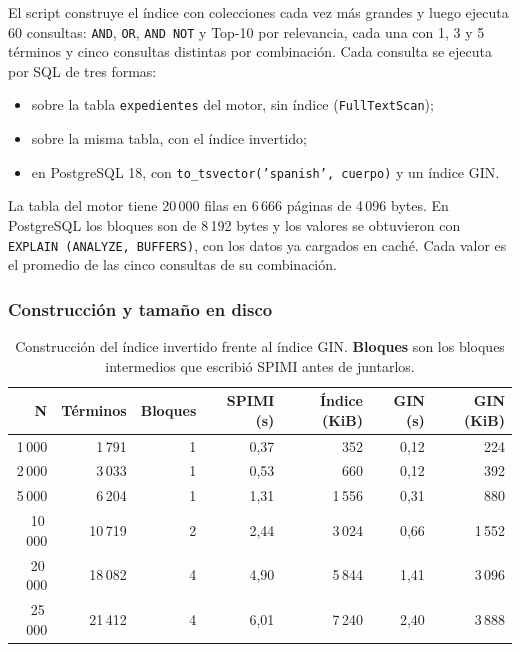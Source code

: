 \documentclass[a4paper,12pt]{article}
\begin{document}
El script construye el índice con colecciones cada vez más grandes y luego
ejecuta 60 consultas: \texttt{AND}, \texttt{OR}, \texttt{AND NOT} y Top-10 por
relevancia, cada una con 1, 3 y 5 términos y cinco consultas distintas por
combinación. Cada consulta se ejecuta por SQL de tres formas:

\begin{itemize}
    \item sobre la tabla \texttt{expedientes} del motor, sin índice
    (\texttt{FullTextScan});
    \item sobre la misma tabla, con el índice invertido;
    \item en PostgreSQL 18, con \texttt{to\_tsvector('spanish', cuerpo)} y un
    índice GIN.
\end{itemize}

La tabla del motor tiene 20\,000 filas en 6\,666 páginas de 4\,096 bytes. En
PostgreSQL los bloques son de 8\,192 bytes y los valores se obtuvieron con
\texttt{EXPLAIN (ANALYZE, BUFFERS)}, con los datos ya cargados en caché. Cada
valor es el promedio de las cinco consultas de su combinación.

\subsubsection{Construcción y tamaño en disco}

\begin{table}[H]
\centering
\caption{Construcción del índice invertido frente al índice GIN.
\textbf{Bloques} son los bloques intermedios que escribió SPIMI antes de
juntarlos.}
\begin{tabular}{@{}rrrrrrr@{}}
\toprule
\textbf{N} & \textbf{Términos} & \textbf{Bloques} & \textbf{SPIMI (s)} &
\textbf{Índice (KiB)} & \textbf{GIN (s)} & \textbf{GIN (KiB)} \\
\midrule
1\,000 & 1\,791 & 1 & 0{,}37 & 352 & 0{,}12 & 224 \\
2\,000 & 3\,033 & 1 & 0{,}53 & 660 & 0{,}12 & 392 \\
5\,000 & 6\,204 & 1 & 1{,}31 & 1\,556 & 0{,}31 & 880 \\
10\,000 & 10\,719 & 2 & 2{,}44 & 3\,024 & 0{,}66 & 1\,552 \\
20\,000 & 18\,082 & 4 & 4{,}90 & 5\,844 & 1{,}41 & 3\,096 \\
25\,000 & 21\,412 & 4 & 6{,}01 & 7\,240 & 2{,}40 & 3\,888 \\
\bottomrule
\end{tabular}
\end{table}
\end{document}
